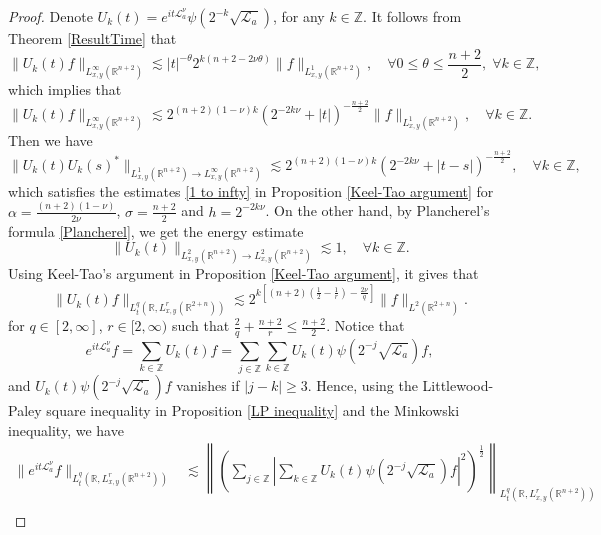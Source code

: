 \documentclass[a4paper,11pt, reqno]{amsart}
\numberwithin{equation}{section}
\theoremstyle{plain}
\theoremstyle{definition}
\theoremstyle{remark}
\begin{document}
\begin{proof} Denote $U_k(t)=e^{it\mathcal{L}_a^\nu}\psi(2^{-k}\sqrt{\mathcal{L}_a})$, for any $k\in\mathbb{Z}$.
It follows from Theorem \ref{ResultTime} that
\begin{equation*}
\|U_k(t)f\|_{L^\infty_{x,y}(\mathbb{R}^{n+2})}\lesssim |t|^{-\theta}2^{k(n+2-2\nu\theta)}\|f\|_{L^1_{x,y}(\mathbb{R}^{n+2})},\quad \forall 0\leq \theta\leq \frac{n+2}{2},\; \forall k\in\mathbb{Z},
\end{equation*}
which implies that
\begin{equation*}
\|U_k(t)f\|_{L^\infty_{x,y}(\mathbb{R}^{n+2})}\lesssim 2^{(n+2)(1-\nu)k}(2^{-2k\nu}+|t|)^{-\frac{n+2}{2}}\|f\|_{L^1_{x,y}(\mathbb{R}^{n+2})},\quad \forall k\in\mathbb{Z}.
\end{equation*}
Then we have
\begin{equation*}
\|U_k(t)U_k(s)^*\|_{L^1_{x,y}(\mathbb{R}^{n+2})\rightarrow L^\infty_{x,y}(\mathbb{R}^{n+2})}\lesssim 2^{(n+2)(1-\nu)k}(2^{-2k\nu}+|t-s|)^{-\frac{n+2}{2}},\quad \forall k\in\mathbb{Z},
\end{equation*}
which satisfies the estimates \eqref{1 to infty} in Proposition \ref{Keel-Tao argument} for $\alpha=\frac{(n+2)(1-\nu)}{2\nu}$, $\sigma=\frac{n+2}{2}$ and $h=2^{-2k\nu}$. 
On the other hand, by Plancherel's formula \eqref{Plancherel}, we get the energy estimate
\begin{equation*}
\|U_k(t)\|_{L^2_{x,y}(\mathbb{R}^{n+2})\rightarrow L^2_{x,y}(\mathbb{R}^{n+2})}\lesssim 1,\quad \forall k\in\mathbb{Z}.
\end{equation*}
Using Keel-Tao's argument in Proposition \ref{Keel-Tao argument}, it gives that
\begin{equation*}
\|U_k(t)f\|_{L_t^q(\mathbb{R},L^r_{x,y}(\mathbb{R}^{2+n}))}\lesssim 2^{k[(n+2)(\frac{1}{2}-\frac{1}{r})-\frac{2\nu}{q}]}\|f\|_{L^2(\mathbb{R}^{2+n})}.
\end{equation*}
for $q\in[2,\infty]$, $r\in [2,\infty)$ such that $\frac{2}{q}+\frac{n+2}{r}\leq \frac{n+2}{2}$. Notice that
\begin{equation*}
e^{it{\mathcal{L}_a^{\nu}}}f=\sum_{k\in\mathbb{Z}}U_k(t)f=\sum_{j\in\mathbb{Z}}\sum_{k\in\mathbb{Z}}U_k(t)\psi(2^{-j}\sqrt{\mathcal{L}_a})f,
\end{equation*}
and $U_k(t)\psi(2^{-j}\sqrt{\mathcal{L}_a})f$ vanishes if $|j-k|\geq3$. Hence, using the Littlewood-Paley square inequality in Proposition \ref{LP inequality} and the Minkowski inequality, we have
\begin{align*}
\|e^{it\mathcal{L}_a^\nu}f\|_{L_t^q(\mathbb{R},L^r_{x,y}(\mathbb{R}^{n+2}))}&\lesssim \left\|\left(\sum_{j\in\mathbb{Z}}|\sum_{k\in\mathbb{Z}}U_k(t)\psi(2^{-j}\sqrt{\mathcal{L}_a})f|^2\right)^\frac{1}{2}\right\|_{L_t^q(\mathbb{R},L^r_{x,y}(\mathbb{R}^{n+2}))}\\

\end{align*}
\end{proof}
\end{document}
